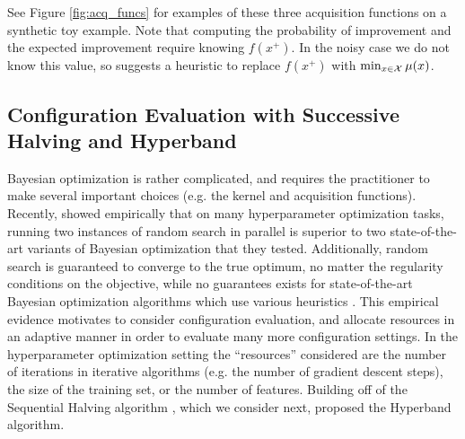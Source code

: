 \documentclass[11pt]{article}
\begin{document}
See Figure \ref{fig:acq_funcs} for examples of these three acquisition functions on a synthetic toy example. Note that computing the probability of improvement and the expected improvement require knowing $f(x^+)$. In the noisy case we do not know this value, so \cite{Gramacy2012} suggests a heuristic to replace $f(x^+)$ with $\min_{x \in \mathcal{X}} \mu(x)$.
\subsection{Configuration Evaluation with Successive Halving and Hyperband}

Bayesian optimization is rather complicated, and requires the practitioner to make several important choices (e.g. the kernel and acquisition functions). Recently, \cite{Li2016} showed empirically that on many hyperparameter optimization tasks, running two instances of random search in parallel is superior to two state-of-the-art variants of Bayesian optimization that they tested. Additionally, random search is guaranteed to converge to the true optimum, no matter the regularity conditions on the objective, while no guarantees exists for state-of-the-art Bayesian optimization algorithms which use various heuristics \cite{Li2016}. This empirical evidence motivates \cite{Li2016} to consider configuration evaluation, and allocate resources in an adaptive manner in order to evaluate many more configuration settings. In the hyperparameter optimization setting the ``resources'' considered are the number of iterations in iterative algorithms (e.g. the number of gradient descent steps), the size of the training set, or the number of features. Building off of the Sequential Halving algorithm \cite{Karnin2013, Jamieson2015}, which we consider next, \cite{Li2016} proposed the Hyperband algorithm.
\end{document}
